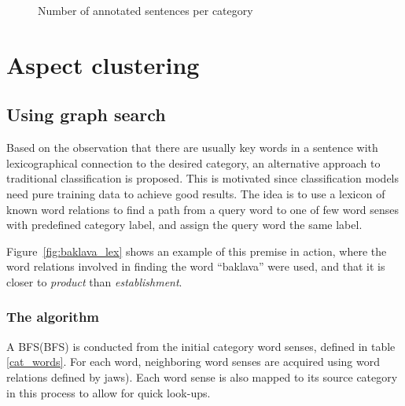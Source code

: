 \documentclass[a4paper,11pt]{kth-mag}
\begin{document}
\begin{figure}[t]
  \centering
  \caption{Number of annotated sentences per category}
  \label{fig:cat_count}
\end{figure}


\newpage

\section{Aspect clustering}
\subsection{Using graph search}
Based on the observation that there are usually key words in a sentence with lexicographical connection to the desired category, an alternative approach to traditional classification is proposed. This is motivated since classification models need pure training data to achieve good results. The idea is to use a lexicon of known word relations to find a path from a query word to one of few word senses with predefined category label, and assign the query word the same label.

Figure~\ref{fig:baklava_lex} shows an example of this premise in action, where the word relations involved in finding the word ``baklava'' were used, and that it is closer to \emph{product} than \emph{establishment}.

\subsubsection{The algorithm}
A \gls{BFS}(BFS) is conducted from the initial category word senses, defined in table \ref{cat_words}. For each word, neighboring word senses are acquired using word relations defined by \gls{jaws}). Each word sense is also mapped to its source category in this process to allow for quick look-ups.
\end{document}
